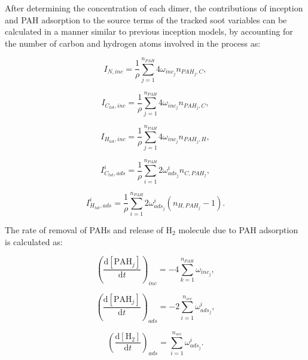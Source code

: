 After determining the concentration of each dimer, the contributions of inception and PAH adsorption to the source terms of the tracked soot variables can be calculated in a manner similar to previous inception models, by accounting for the number of carbon and hydrogen atoms involved in the process as:

\begin{equation}
	I_{N,{inc}} = \frac{1}{\rho}
	\sum_{j=1}^{n_{PAH}}
	4\omega_{inc_{j}} 
	n_{PAH_j,C}
	\label{eqn:IN_inc_dimcoal},
\end{equation}

\begin{equation}
	I_{C_{tot},{inc}} = \frac{1}{\rho}
	\sum_{j=1}^{n_{PAH}}
	4\omega_{inc_{j}} 
	n_{PAH_j,C}
	\label{eqn:ICtot_inc_dimcoal},
\end{equation}

\begin{equation}
	I_{H_{tot},{inc}} = \frac{1}{\rho}
	\sum_{j=1}^{n_{PAH}}
	4\omega_{inc_{j}} 
	n_{PAH_j,H}
	\label{eqn:IHtot_inc_dimcoal},
\end{equation}

\begin{equation}
	I^i_{C_{tot},ads} =
	\frac{1}{\rho}
	\sum_{i=1}^{n_{PAH}}
	2\omega^i_{ads_j}
	n_{C,PAH_j}
	\label{eqn:ICtotads_dimcoal},
\end{equation}

\begin{equation}
	I^i_{H_{tot},ads} =
	\frac{1}{\rho}
	\sum_{i=1}^{n_{PAH}}
	2\omega^i_{ads_j}
	\left(n_{H,PAH_j}-1\right)
	\label{eqn:IHtotads_dimcoal}.
\end{equation}

The rate of removal of PAHs and release of $\mathrm{H_2}$ molecule due to PAH adsorption is calculated as:

\begin{equation}
	\left(
	\frac{\mathrm{d}\left[{\mathrm{PAH}_j}\right]}{\mathrm{d}t}
	\right)_{inc}
	= 
	-4\sum_{k=1}^{n_{PAH}}\omega_{inc_{j}},
	\label{eqn:PAHscrub_dimcoal_inc}
\end{equation}

\begin{equation}
	\left(
	\frac{\mathrm{d}\left[{\mathrm{PAH}_j}\right]}{\mathrm{d}t}
	\right)_{ads}
	= 
	-2\sum_{i=1}^{n_{sec}}\omega^i_{ads_j},
	\label{eqn:PAHscrub_dimcoal_ads}
\end{equation}

\begin{equation}
	\left(
	\frac{\mathrm{d}\left[{\mathrm{H_2}}\right]}{\mathrm{d}t}
	\right)_{ads}
	= 
	\sum_{i=1}^{n_{sec}}\omega^i_{ads_j}
	\label{eqn:H2scrub_dimcoal}.
\end{equation}


